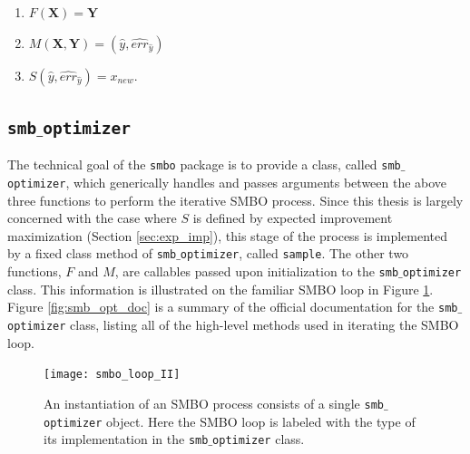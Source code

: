 \begin{enumerate}
\item $F(\mathbf{X})=\mathbf{Y}$
\item $M(\mathbf{X},\mathbf{Y}) = (\hat{y},\hat{err}_{\hat{y}})$
\item $S(\hat{y},\hat{err}_{\hat{y}}) = x_{new}$.
\end{enumerate}

\subsection{\texttt{smb$\_$optimizer}}

The technical goal of the \texttt{smbo} package is to provide a class, called \texttt{smb$\_$optimizer}, which generically handles and passes arguments between the above three functions to perform the iterative SMBO process. Since this thesis is largely concerned with the case where $S$ is defined by expected improvement maximization (Section \ref{sec:exp_imp}), this stage of the process is implemented by a fixed class method of \texttt{smb$\_$optimizer}, called \texttt{sample}. The other two functions, $F$ and $M$, are callables passed upon initialization to the \texttt{smb$\_$optimizer} class. This information is illustrated on the familiar SMBO loop in Figure \ref{fig:smbo_loop_II}. Figure \ref{fig:smb_opt_doc} is a summary of the official documentation for the \texttt{smb$\_$optimizer} class, listing all of the high-level methods used in iterating the SMBO loop.

\begin{figure}[h]
	\centering
	\texttt{[image: smbo\_loop\_II]}
	\caption{An instantiation of an SMBO process consists of a single \texttt{smb$\_$optimizer} object. Here the SMBO loop is labeled with the type of its implementation in the \texttt{smb$\_$optimizer} class.}
	\label{fig:smbo_loop_II}

\end{figure}


\begin{minipage}{\textwidth}
\begin{framed}

\end{framed}

 \label{fig:smb_opt_doc}

\end{minipage}




